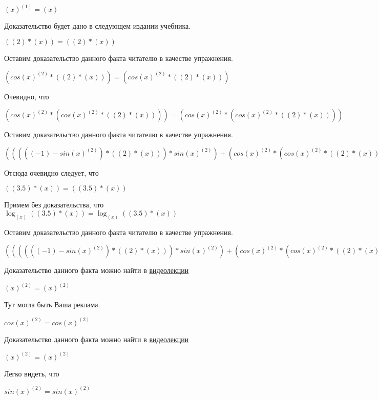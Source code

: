 \documentclass[12pt,a4paper,fleqn]{article}
\theoremstyle{definition}
\begin{document}
${( x )}^{( 1 )} = ( x )$

Доказательство будет дано в следующем издании учебника.

$(( 2 ) * ( x )) = (( 2 ) * ( x ))$

Оставим доказательство данного факта читателю в качестве упражнения.

$(cos{( x )}^{( 2 )} * (( 2 ) * ( x ))) = (cos{( x )}^{( 2 )} * (( 2 ) * ( x )))$

Очевидно, что

$(cos{( x )}^{( 2 )} * (cos{( x )}^{( 2 )} * (( 2 ) * ( x )))) = (cos{( x )}^{( 2 )} * (cos{( x )}^{( 2 )} * (( 2 ) * ( x ))))$

Оставим доказательство данного факта читателю в качестве упражнения.

$((((( -1 ) - sin{( x )}^{( 2 )}) * (( 2 ) * ( x ))) * sin{( x )}^{( 2 )}) + (cos{( x )}^{( 2 )} * (cos{( x )}^{( 2 )} * (( 2 ) * ( x ))))) = ((((( -1 ) - sin{( x )}^{( 2 )}) * (( 2 ) * ( x ))) * sin{( x )}^{( 2 )}) + (cos{( x )}^{( 2 )} * (cos{( x )}^{( 2 )} * (( 2 ) * ( x )))))$

Отсюда очевидно следует, что

$(( 3.5 ) * ( x )) = (( 3.5 ) * ( x ))$

Примем без доказательства, что
$\log_{( x )}{(( 3.5 ) * ( x ))} = \log_{( x )}{(( 3.5 ) * ( x ))}$

Оставим доказательство данного факта читателю в качестве упражнения.

$(((((( -1 ) - sin{( x )}^{( 2 )}) * (( 2 ) * ( x ))) * sin{( x )}^{( 2 )}) + (cos{( x )}^{( 2 )} * (cos{( x )}^{( 2 )} * (( 2 ) * ( x ))))) * \log_{( x )}{(( 3.5 ) * ( x ))}) = (((((( -1 ) - sin{( x )}^{( 2 )}) * (( 2 ) * ( x ))) * sin{( x )}^{( 2 )}) + (cos{( x )}^{( 2 )} * (cos{( x )}^{( 2 )} * (( 2 ) * ( x ))))) * \log_{( x )}{(( 3.5 ) * ( x ))})$

Доказательство данного факта можно найти в \href{https://www.youtube.com/watch?v=dQw4w9WgXcQ}{видеолекции}

${( x )}^{( 2 )} = {( x )}^{( 2 )}$

Тут могла быть Ваша реклама.

$cos{( x )}^{( 2 )} = cos{( x )}^{( 2 )}$

Доказательство данного факта можно найти в \href{https://www.youtube.com/watch?v=dQw4w9WgXcQ}{видеолекции}

${( x )}^{( 2 )} = {( x )}^{( 2 )}$

Легко видеть, что

$sin{( x )}^{( 2 )} = sin{( x )}^{( 2 )}$
\end{document}
